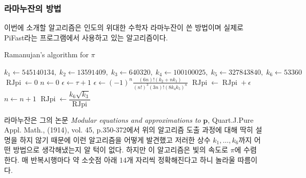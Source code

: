 \documentclass[10pt]{article}
\newcommand{\opn}{\operatorname}
\begin{document}
\subsubsection{라마누잔의 방법}
이번에 소개할 알고리즘은 인도의 위대한 수학자 라마누잔이 쓴 방법이며 실제로 PiFast라는 프로그램에서 사용하고 있는 알고리즘이다.
\begin{algorithm}
  \caption{Ramanujan's algorithm for $\pi$}
  \begin{algorithmic}[1]
  \label{RMpi}
    \State $k_{1} \gets 545140134,\; k_{2} \gets 13591409,\; k_{3} \gets 640320, \; k_{4}\gets 100100025, \; k_{5} \gets 327843840, \; k_{6} \gets 53360 $
    \State $\opn{RJpi} \gets 0$
    \State $n \gets 0$
    \State $\epsilon \gets \tau + 1$
    \While{$\epsilon > \tau$}
      \State $\epsilon \gets \left(-1\right)^{n}\frac{\left(6n\right)!\left(k_{2}+nk_{1}\right)}{\left(n!\right)^{3}\left(3n\right)!\left(8k_{4}k_{5}\right)^{n}}$
      \State $\opn{RJpi} \gets \opn{RJpi} + \epsilon$
      \State $n \gets n + 1$
    \EndWhile
    \State $\opn{RJpi} \gets \dfrac{k_{6}\sqrt{k_{3}}}{\opn{RJpi}}$ 
  \EndProcedure
  \end{algorithmic}
\end{algorithm}

라마누잔은 그의 논문 \emph{Modular equations and approximations to} $\boldsymbol{p}$, Quart.J.Pure Appl. Math., (1914), vol. 45, p.350-372에서 위의 알고리즘 도출 과정에 대해 딱히 설명을 하지 않기 때문에 이런 알고리즘을 어떻게 발견했고 저러한 상수 $k_{1},\ldots , k_{6}$까지 어떤 방법으로 생각해냈는지 알 턱이 없다. 하지만 이 알고리즘은 빛의 속도로 $\pi$에 수렴한다. 매 반복시행마다 약 소숫점 아래 14개 자리씩 정확해진다고 하니 놀라울 따름이다.
\end{document}
